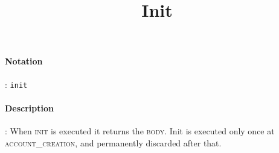 \documentclass	[10pt,a4paper,oneside]{scrartcl}
\author{}
\title{Init}
\date{}
\begin{document}
\maketitle
\paragraph{Notation}: \texttt{init}
\paragraph{Description}: When \textsc{init} is executed it returns the \textsc{body}. Init is executed only once at \textsc{account\_creation}, and permanently discarded after that.   
\end{document}
